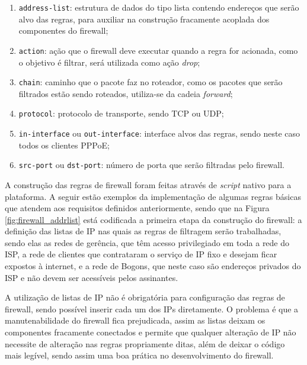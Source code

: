    \begin{enumerate}[label=\alph*)]
        \item {\tt address-list}: estrutura de dados do tipo lista contendo endereços que serão alvo das regras, para auxiliar na construção fracamente acoplada dos componentes do firewall;
        \item {\tt action}: ação que o firewall deve executar quando a regra for acionada, como o objetivo é filtrar, será utilizada como ação \textit{drop};
        \item {\tt chain}: caminho que o pacote faz no roteador, como os pacotes que serão filtrados estão sendo roteados, utiliza-se da cadeia \textit{forward};
        \item {\tt protocol}: protocolo de transporte, sendo TCP ou UDP;
        \item {\tt in-interface} ou {\tt out-interface}: interface alvos das regras, sendo neste caso todos os clientes PPPoE;
        \item {\tt src-port} ou {\tt dst-port}: número de porta que serão filtradas pelo firewall.
    \end{enumerate}

    A construção das regras de firewall foram feitas através de \textit{script} nativo para a plataforma. A seguir estão exemplos da implementação de algumas regras básicas que atendem aos requisitos definidos anteriormente, sendo que na Figura \ref{fig:firewall_addrlist} está codificada a primeira etapa da construção do firewall: a definição das listas de IP nas quais as regras de filtragem serão trabalhadas, sendo elas as redes de gerência, que têm acesso privilegiado em toda a rede do ISP, a rede de clientes que contrataram o serviço de IP fixo e desejam ficar expostos à internet, e a rede de Bogons, que neste caso são endereços privados do ISP e não devem ser acessíveis pelos assinantes.
    
    A utilização de listas de IP não é obrigatória para configuração das regras de firewall, sendo possível inserir cada um dos IPs diretamente. O problema é que a manutenabilidade do firewall fica prejudicada, assim as listas deixam os componentes fracamente conectados e permite que qualquer alteração de IP não necessite de alteração nas regras propriamente ditas, além de deixar o código mais legível, sendo assim uma boa prática no desenvolvimento do firewall.
    
